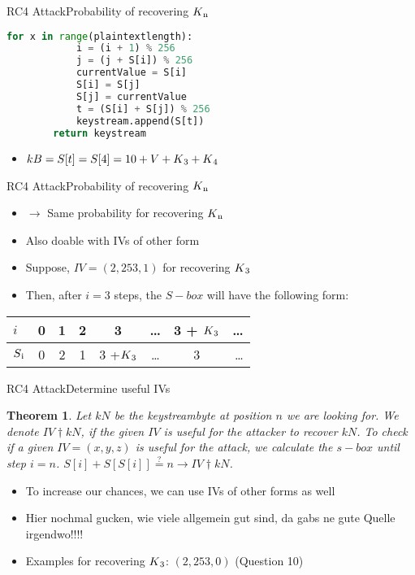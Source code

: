 \documentclass[
	aspectratio=169,	%
	onlytextwidth,		%
	t,					%
	]{beamer}
\newtheorem{thm}{Theorem}
\begin{document}
\begin{frame}[fragile]{RC4 Attack}{Probability of recovering $K\textsubscript{n}$}
	\small
	\begin{lstlisting}[language=Python]
		for x in range(plaintextlength):
			i = (i + 1) % 256
			j = (j + S[i]) % 256
			currentValue = S[i]
			S[i] = S[j]
			S[j] = currentValue
			t = (S[i] + S[j]) % 256
			keystream.append(S[t])
		return keystream
	\end{lstlisting}
	\normalsize

	\begin{itemize}
		\item $kB = S[t] = S[4] = 10 + V + K\textsubscript{3} + K\textsubscript{4}$
	\end{itemize}
\end{frame}

\begin{frame}[fragile]{RC4 Attack}{Probability of recovering $K\textsubscript{n}$}
	\begin{itemize}
		\item $\rightarrow$ Same probability for recovering $K\textsubscript{n}$
		\item Also doable with IVs of other form
		\item Suppose, $IV = (2,253,1)$ for recovering $K\textsubscript{3}$
		\item Then, after $i=3$ steps, the $S-box$ will have the following form:
	\end{itemize}

	\begin{tabular}{l|c|c|c|c|c|c|r}
		$i$ & 0 & 1 & 2 & 3 & \dots & 3 + $K\textsubscript{3}$ & \dots \\
		\hline
		$S\textsubscript{i}$ & 0 & 2 & 1 & 3 +$K\textsubscript{3}$ & \dots & 3 & \dots\\
	\end{tabular}
\end{frame}

\begin{frame}[fragile]{RC4 Attack}{Determine useful IVs}
	\begin{thm}
		Let $kN$ be the keystreambyte at position $n$ we are looking for. We denote $IV \dagger kN$, if the given $IV$ is useful for the attacker to recover $kN$.
		To check if a given $IV=(x,y,z)$ is useful for the attack, we calculate the $s-box$ until step $i=n$. 
		$S[i] + S[S[i]] \stackrel{?}{=} n \rightarrow IV \dagger kN$.
	\end{thm} 
	\begin{itemize}
		\item To increase our chances, we can use IVs of other forms as well
		\item Hier nochmal gucken, wie viele allgemein gut sind, da gabs ne gute Quelle irgendwo!!!!
		\item Examples for recovering $K\textsubscript{3}$: $(2,253,0)$ (Question 10)
	\end{itemize}
\end{frame}
\end{document}

